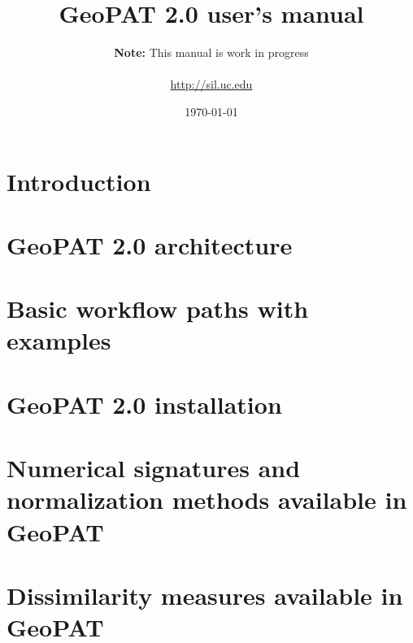 \documentclass[12pt,margin=0.5in]{article}
\title{GeoPAT 2.0 user's manual}
\author{{\bf Note:} This manual is work in progress \\ \\ \url{http://sil.uc.edu}}
\date{\today}
\begin{document}
\maketitle
\newpage

\tableofcontents
\newpage

\section{Introduction}


\section{GeoPAT 2.0 architecture}


\section{Basic workflow paths with examples}


\FloatBarrier

\begin{appendices}

\section{GeoPAT 2.0 installation}


\section{Numerical signatures and normalization methods available in GeoPAT \label{signatures}} 


\section{Dissimilarity measures available in GeoPAT \label{measures}}


\end{appendices}



\end{document}
